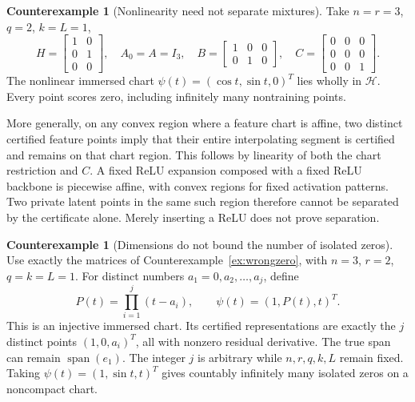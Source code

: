 \documentclass[11pt,a4paper]{article}
\theoremstyle{definition}
\theoremstyle{definition}
\newtheorem{example}[theorem]{Counterexample}
\theoremstyle{remark}\newtheorem{remark}[theorem]{Remark}
\newcommand{\HH}{\mathcal H}\newcommand{\XX}{\mathcal X}\newcommand{\col}{\operatorname{col}}
\begin{document}
\begin{example}[Nonlinearity need not separate mixtures]\label{ex:nonlinear}
Take $n=r=3$, $q=2$, $k=L=1$,
\[
H=\begin{bmatrix}1&0\\0&1\\0&0\end{bmatrix},\quad A_0=A=I_3,\quad
B=\begin{bmatrix}1&0&0\\0&1&0\end{bmatrix},\quad
C=\begin{bmatrix}0&0&0\\0&0&0\\0&0&1\end{bmatrix}.
\]
The nonlinear immersed chart $\psi(t)=(\cos t,\sin t,0)^T$ lies wholly in $\HH$. Every point scores zero, including infinitely many nontraining points.

More generally, on any convex region where a feature chart is affine, two distinct certified feature points imply that their entire interpolating segment is certified and remains on that chart region. This follows by linearity of both the chart restriction and $C$. A fixed ReLU expansion composed with a fixed ReLU backbone is piecewise affine, with convex regions for fixed activation patterns. Two private latent points in the same such region therefore cannot be separated by the certificate alone. Merely inserting a ReLU does not prove separation.
\end{example}

\begin{example}[Dimensions do not bound the number of isolated zeros]\label{ex:many}
Use exactly the matrices of Counterexample~\ref{ex:wrongzero}, with $n=3$, $r=2$, $q=k=L=1$. For distinct numbers $a_1=0,a_2,\ldots,a_j$, define
\[
P(t)=\prod_{i=1}^j(t-a_i),\qquad \psi(t)=(1,P(t),t)^T.
\]
This is an injective immersed chart. Its certified representations are exactly the $j$ distinct points $(1,0,a_i)^T$, all with nonzero residual derivative. The true span can remain $\operatorname{span}(e_1)$. The integer $j$ is arbitrary while $n,r,q,k,L$ remain fixed. Taking $\psi(t)=(1,\sin t,t)^T$ gives countably infinitely many isolated zeros on a noncompact chart.
\end{example}
\end{document}
